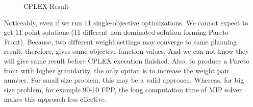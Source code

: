 \documentclass[10pt,journal,compsoc]{IEEEtran}
\begin{document}
\begin{figure}[!t]
\centering
{}
\hfil
{}
\caption{CPLEX Result} 
\label{cplex-compose}
\end{figure}
Noticeably, even if we run 11 single-objective optimizations. We cannot expect to get 11 point solutions (11 different non-dominated solution forming Pareto Front). Because, two different weight settings may converge to same planning result; therefore, gives same objective function values. And we can not know they will give same result before CPLEX execution finished. Also, to produce a Pareto front with higher granularity, the only option is to increase the weight pair number. For small size problem, this may be a valid approach. Whereas, for big size problem, for example 90-10 FPP, the long computation time of MIP solver makes this approach less effective.
\fi
\end{document}
